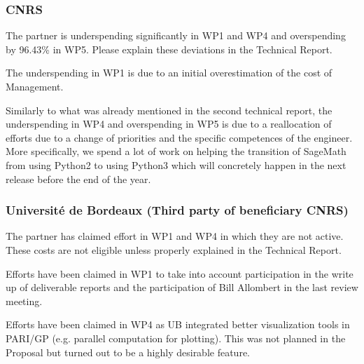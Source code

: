 \subsubsection{CNRS}
\begin{EUcomment}
  The partner is underspending significantly in WP1 and WP4 and
  overspending by 96.43\% in WP5. Please explain these deviations in
  the Technical Report.
\end{EUcomment}
The underspending in WP1 is due to an initial overestimation of the
cost of Management.

Similarly to what was already mentioned in the second technical report, the
underspending in WP4 and overspending in WP5 is due to a reallocation of
efforts due to a change of priorities and the specific competences of the
engineer. More specifically, we spend a lot of work on helping the transition
of SageMath from using Python2 to using Python3 which will concretely happen
in the next release before the end of the year.

\subsubsection{Université de Bordeaux (Third party of beneficiary CNRS)}

\begin{EUcomment}
  The partner has claimed effort in WP1 and WP4 in which they are not
  active. These costs are not eligible unless properly explained in
  the Technical Report.
\end{EUcomment}
Efforts have been claimed in WP1 to take into account participation in
the write up of deliverable reports and
the participation of Bill Allombert in the last review meeting.

Efforts have been claimed in WP4 as UB integrated better visualization tools in
PARI/GP (e.g. parallel computation for plotting). This was not planned in the
Proposal but turned out to be a highly desirable feature.

\subsubsection{}

